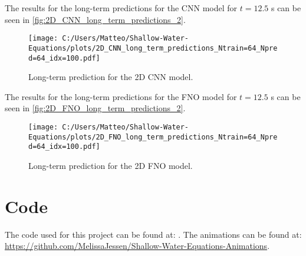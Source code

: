 The results for the long-term predictions for the CNN model for $t= 12.5$ s can be seen in \autoref{fig:2D_CNN_long_term_predictions_2}.
\begin{figure}[H]
    \centering
    \texttt{[image: C:/Users/Matteo/Shallow-Water-Equations/plots/2D\_CNN\_long\_term\_predictions\_Ntrain=64\_Npred=64\_idx=100.pdf]}
    \caption{Long-term prediction for the 2D CNN model.}\label{fig:2D_CNN_long_term_predictions_2}
\end{figure}

The results for the long-term predictions for the FNO model for $t= 12.5$ s can be seen in \autoref{fig:2D_FNO_long_term_predictions_2}.
\begin{figure}[H]
    \centering
    \texttt{[image: C:/Users/Matteo/Shallow-Water-Equations/plots/2D\_FNO\_long\_term\_predictions\_Ntrain=64\_Npred=64\_idx=100.pdf]}
    \caption{Long-term prediction for the 2D FNO model.}\label{fig:2D_FNO_long_term_predictions_2}
\end{figure}


\section{Code}
The code used for this project can be found at: \cite{Github_SWE}.
The animations can be found at: \url{https://github.com/MelissaJessen/Shallow-Water-Equations-Animations}.

